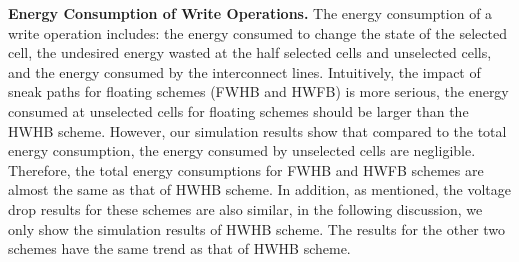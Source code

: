 \vspace{5pt}\noindent\textbf{Energy Consumption of Write Operations.}
%
The energy consumption of a write operation includes: the energy consumed
to change the state of the selected cell, the undesired energy wasted at
the half selected cells and unselected cells, and the energy consumed by
the interconnect lines. Intuitively, the impact of sneak paths for
floating schemes (FWHB and HWFB) is more serious, the energy consumed at
unselected cells for floating schemes should be larger than the HWHB
scheme. However, our simulation results show that compared to the total
energy consumption, the energy consumed by unselected cells are
negligible. Therefore, the total energy consumptions for FWHB and HWFB
schemes are almost the same as that of HWHB scheme. In addition, as
mentioned, the voltage drop results for these schemes are also similar, in
the following discussion, we only show the simulation results of HWHB
scheme. The results for the other two schemes have the same trend as that
of HWHB scheme.

